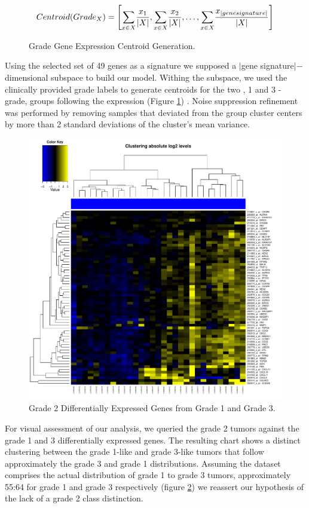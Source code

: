 \documentclass[a4paper,10pt]{article}
\begin{document}
\begin{figure}
$$
Centroid(Grade_X)= \left[              \underset{x\in X}     \sum{  { {x_1}    \over {| X |} } }   ,   
 \underset{x\in X}     \sum{  { {x_2}    \over {| X |} } },
\ldots ,
 \underset{x\in X}     \sum{  { {x_{| gene signature |}}    \over {| X |} } }                 \right] 
$$
\caption{Grade Gene Expression Centroid Generation.}\label{centroid}
\end{figure}
Using the selected set of 49 genes as a signature we supposed a $|$gene signature$|-$dimensional subspace to build our model.
Withing the subspace, we used the clinically provided grade labels to generate centroids for the two , 1 and 3 - grade, groups following
the expression (Figure \ref{centroid}) . Noise suppression refinement was performed by removing samples that deviated from the group cluster
centers by more than 2 standard deviations of the cluster's mean variance.\\

\begin{figure}
\centering
\includegraphics[scale=0.38]{docs/grade2onupregulated3}
\caption{Grade 2 Differentially Expressed Genes from Grade 1 and Grade 3.}\label{grade2up}
\end{figure}
For visual assessment of our analysis, we queried the grade 2 tumors against the grade 1 and 3 differentially expressed genes. The resulting chart
shows a distinct clustering between the grade 1-like and grade 3-like tumors that follow approximately 
the grade 3 and grade 1 distributions. Assuming the dataset comprises the actual distribution 
of grade 1 to grade 3 tumors, approximately 55:64 for grade 1 and grade 3 respectively (figure \ref{grade2up}) we reassert our hypothesis
of the lack of a grade 2 class distinction.
\end{document}
